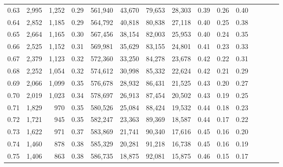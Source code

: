 \begin{tabular}{rrrcrrrrrrrrrrr}
0.63 &   2,995 &  1,252 &                                       0.29 &  561,940 &   43,670 &   79,653 &   28,303 &  0.39 &  0.26 &                         0.40 \\
0.64 &   2,852 &  1,185 &                                       0.29 &  564,792 &   40,818 &   80,838 &   27,118 &  0.40 &  0.25 &                         0.38 \\
0.65 &   2,664 &  1,165 &                                       0.30 &  567,456 &   38,154 &   82,003 &   25,953 &  0.40 &  0.24 &                         0.35 \\
0.66 &   2,525 &  1,152 &                                       0.31 &  569,981 &   35,629 &   83,155 &   24,801 &  0.41 &  0.23 &                         0.33 \\
0.67 &   2,379 &  1,123 &                                       0.32 &  572,360 &   33,250 &   84,278 &   23,678 &  0.42 &  0.22 &                         0.31 \\
0.68 &   2,252 &  1,054 &                                       0.32 &  574,612 &   30,998 &   85,332 &   22,624 &  0.42 &  0.21 &                         0.29 \\
0.69 &   2,066 &  1,099 &                                       0.35 &  576,678 &   28,932 &   86,431 &   21,525 &  0.43 &  0.20 &                         0.27 \\
0.70 &   2,019 &  1,023 &                                       0.34 &  578,697 &   26,913 &   87,454 &   20,502 &  0.43 &  0.19 &                         0.25 \\
0.71 &   1,829 &    970 &                                       0.35 &  580,526 &   25,084 &   88,424 &   19,532 &  0.44 &  0.18 &                         0.23 \\
0.72 &   1,721 &    945 &                                       0.35 &  582,247 &   23,363 &   89,369 &   18,587 &  0.44 &  0.17 &                         0.22 \\
0.73 &   1,622 &    971 &                                       0.37 &  583,869 &   21,741 &   90,340 &   17,616 &  0.45 &  0.16 &                         0.20 \\
0.74 &   1,460 &    878 &                                       0.38 &  585,329 &   20,281 &   91,218 &   16,738 &  0.45 &  0.16 &                         0.19 \\
0.75 &   1,406 &    863 &                                       0.38 &  586,735 &   18,875 &   92,081 &   15,875 &  0.46 &  0.15 &                         0.17 \\

\end{tabular}
